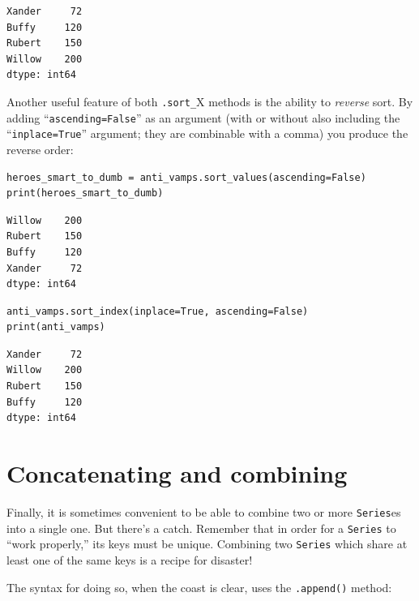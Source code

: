 \begin{Verbatim}[fontsize=\small,samepage=true,frame=leftline,framesep=5mm,framerule=1mm]
Xander     72
Buffy     120
Rubert    150
Willow    200
dtype: int64
\end{Verbatim}

Another useful feature of both \texttt{.sort\_}X methods is the ability to
\textit{reverse} sort. By adding ``\texttt{ascending=False}'' as an argument
(with or without also including the ``\texttt{inplace=True}'' argument; they
are combinable with a comma) you produce the reverse order:

\begin{Verbatim}[fontsize=\footnotesize,samepage=true,frame=single,framesep=3mm]
heroes_smart_to_dumb = anti_vamps.sort_values(ascending=False)
print(heroes_smart_to_dumb)
\end{Verbatim}
\vspace{-.3in}

\begin{Verbatim}[fontsize=\small,samepage=true,frame=leftline,framesep=5mm,framerule=1mm]
Willow    200
Rubert    150
Buffy     120
Xander     72
dtype: int64
\end{Verbatim}

\begin{Verbatim}[fontsize=\small,samepage=true,frame=single,framesep=3mm]
anti_vamps.sort_index(inplace=True, ascending=False)
print(anti_vamps)
\end{Verbatim}
\vspace{-.3in}

\begin{Verbatim}[fontsize=\small,samepage=true,frame=leftline,framesep=5mm,framerule=1mm]
Xander     72
Willow    200
Rubert    150
Buffy     120
dtype: int64
\end{Verbatim}

\section{Concatenating and combining}

Finally, it is sometimes convenient to be able to combine two or more
\texttt{Series}es into a single one. But there's a catch. Remember that in
order for a \texttt{Series} to ``work properly,'' its keys must be unique.
Combining two \texttt{Series} which share at least one of the same keys is a
recipe for disaster!

The syntax for doing so, when the coast is clear, uses the \texttt{.append()}
method:

